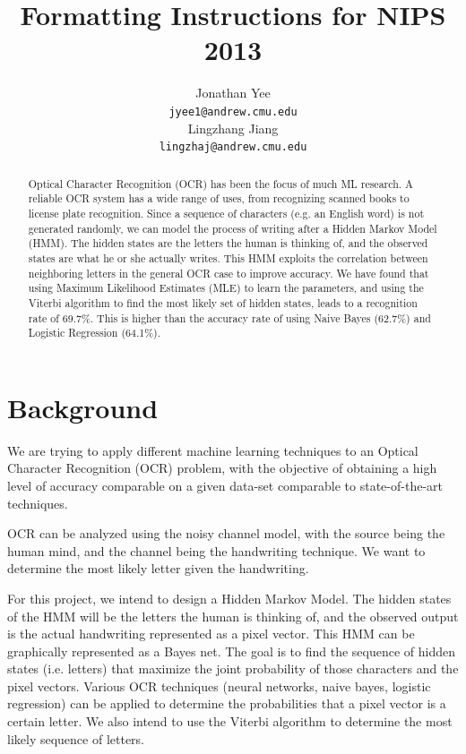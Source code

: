 \documentclass{article} %
\title{Formatting Instructions for NIPS 2013}
\author{
Jonathan Yee\\
\texttt{jyee1@andrew.cmu.edu} \\
\And
Lingzhang Jiang \\
\texttt{lingzhaj@andrew.cmu.edu} \\
}
\begin{document}
\newcommand{\mycount}{\mbox{count}}

\maketitle

\begin{abstract}
Optical Character Recognition (OCR) has been the focus of much ML research. A reliable OCR system has a wide range of uses, from recognizing scanned books to license plate recognition. Since a sequence of characters (e.g. an English word) is not generated randomly, we can model the process of writing after a Hidden Markov Model (HMM). The hidden states are the letters the human is thinking of, and the observed states are what he or she actually writes. This HMM exploits the correlation between neighboring letters in the general OCR case to improve accuracy. We have found that using Maximum Likelihood Estimates (MLE) to learn the parameters, and using the Viterbi algorithm to find the most likely set of hidden states, leads to a recognition rate of 69.7\%. This is higher than the accuracy rate of using Naive Bayes (62.7\%) and Logistic Regression (64.1\%).
\end{abstract}

\section{Background}
We are trying to apply different machine learning techniques to an Optical Character Recognition (OCR) problem, with the objective of obtaining a high level of accuracy comparable on a given data-set comparable to state-of-the-art techniques.

OCR can be analyzed using the noisy channel model, with the source being the human mind, and the channel being the handwriting technique. We want to determine the most likely letter given the handwriting. 

For this project, we intend to design a Hidden Markov Model. The hidden states of the HMM will be the letters the human is thinking of, and the observed output is the actual handwriting represented as a pixel vector. This HMM can be graphically represented as a Bayes net. The goal is to find the sequence of hidden states (i.e. letters) that maximize the joint probability of those characters and the pixel vectors. Various OCR techniques (neural networks, naive bayes, logistic regression) can be applied to determine the probabilities that a pixel vector is a certain letter. We also intend to use the Viterbi algorithm to determine the most likely sequence of letters.
\end{document}
